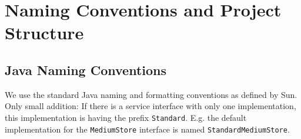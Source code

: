 


\section{Naming Conventions and Project Structure}%
\label{sec:NamingConventions}%

\subsection{Java Naming Conventions}%
\label{sec:JavaNamingConventions}%

We use the standard Java naming and formatting conventions as defined by Sun. Only small addition: If there is a service interface with only one implementation, this implementation is having the prefix \texttt{Standard}. E.g. the default implementation for the \texttt{MediumStore} interface is named \texttt{StandardMediumStore}.


